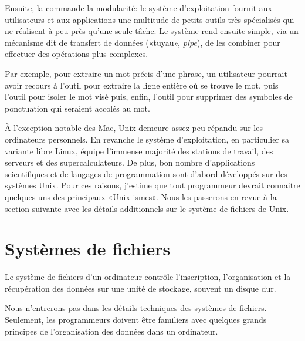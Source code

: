 Ensuite, la
 commande la modularité: le système d'exploitation fournit aux
utilisateurs et aux applications une multitude de petits outils très
spécialisés qui ne réalisent à peu près qu'une seule tâche. Le système
rend ensuite simple, via un mécanisme dit de transfert de données
(«tuyau», \emph{pipe}), de les combiner pour effectuer des opérations
plus complexes.

Par exemple, pour extraire un mot précis d'une phrase, un utilisateur
pourrait avoir recours à l'outil  pour extraire la ligne
entière où se trouve le mot, puis l'outil  pour isoler le
mot visé puis, enfin, l'outil  pour supprimer des symboles
de ponctuation qui seraient accolés au mot.

À l'exception notable des Mac, Unix demeure assez peu
répandu sur les ordinateurs personnels. En revanche le système
d'exploitation, en particulier sa variante libre Linux,
équipe l'immense majorité des stations de travail, des serveurs et des
supercalculateurs. De plus, bon nombre d'applications scientifiques et
de langages de programmation sont d'abord développés sur des systèmes
Unix. Pour ces raisons, j'estime que tout programmeur devrait
connaitre quelques uns des principaux «Unix-ismes». Nous les passerons
en revue à la section suivante avec les détails additionnels sur le
système de fichiers de Unix.



\section{Systèmes de fichiers}
\label{sec:informatique:fs}

Le système de fichiers d'un ordinateur
contrôle l'inscription, l'organisation et la récupération des données
sur une unité de stockage, souvent un disque dur.

Nous n'entrerons pas dans les détails techniques des systèmes de
fichiers. Seulement, les programmeurs doivent être familiers avec
quelques grands principes de l'organisation des données dans un
ordinateur.

